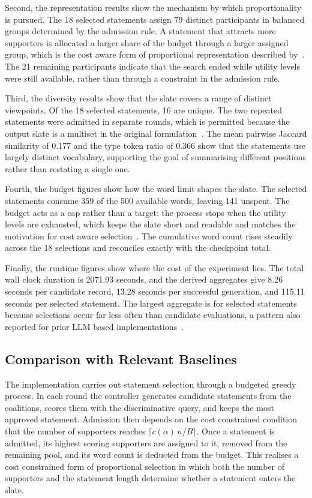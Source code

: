 \documentclass[letterpaper,11pt]{article}
\theoremstyle{plain}
\theoremstyle{definition}
\begin{document}
Second, the representation results show the mechanism by which proportionality is pursued. The 18 selected statements assign 79 distinct participants in balanced groups determined by the admission rule. A statement that attracts more supporters is allocated a larger share of the budget through a larger assigned group, which is the cost aware form of proportional representation described by~\citet{boehmer2025nextgen}. The 21 remaining participants indicate that the search ended while utility levels were still available, rather than through a constraint in the admission rule.

Third, the diversity results show that the slate covers a range of distinct viewpoints. Of the 18 selected statements, 16 are unique. The two repeated statements were admitted in separate rounds, which is permitted because the output slate is a multiset in the original formulation~\citep{fish2026gsc}. The mean pairwise Jaccard similarity of 0.177 and the type token ratio of 0.366 show that the statements use largely distinct vocabulary, supporting the goal of summarising different positions rather than restating a single one.

Fourth, the budget figures show how the word limit shapes the slate. The selected statements consume 359 of the 500 available words, leaving 141 unspent. The budget acts as a cap rather than a target: the process stops when the utility levels are exhausted, which keeps the slate short and readable and matches the motivation for cost aware selection~\citep{boehmer2025nextgen}. The cumulative word count rises steadily across the 18 selections and reconciles exactly with the checkpoint total.

Finally, the runtime figures show where the cost of the experiment lies. The total wall clock duration is 2071.93 seconds, and the derived aggregates give 8.26 seconds per candidate record, 13.28 seconds per successful generation, and 115.11 seconds per selected statement. The largest aggregate is for selected statements because selections occur far less often than candidate evaluations, a pattern also reported for prior LLM based implementations~\citep{boehmer2025nextgen}.

\subsection{Comparison with Relevant Baselines}

The implementation carries out statement selection through a budgeted greedy process. In each round the controller generates candidate statements from the coalitions, scores them with the discriminative query, and keeps the most approved statement. Admission then depends on the cost constrained condition that the number of supporters reaches $\lceil c(\alpha)\,n/B\rceil$. Once a statement is admitted, its highest scoring supporters are assigned to it, removed from the remaining pool, and its word count is deducted from the budget. This realises a cost constrained form of proportional selection in which both the number of supporters and the statement length determine whether a statement enters the slate.
\end{document}

